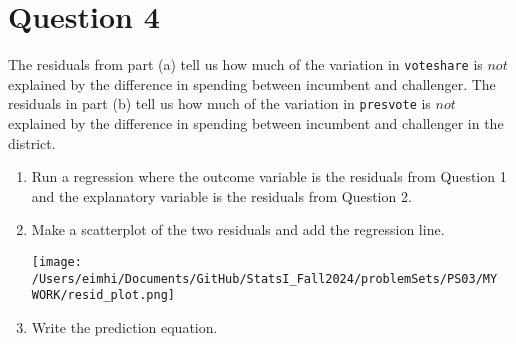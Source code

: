 \documentclass[12pt,letterpaper]{article}
\begin{document}
\section*{Question 4}
\noindent The residuals from part (a) tell us how much of the variation in \texttt{voteshare} is $not$ explained by the difference in spending between incumbent and challenger. The residuals in part (b) tell us how much of the variation in \texttt{presvote} is $not$ explained by the difference in spending between incumbent and challenger in the district.
	\begin{enumerate}
		\item Run a regression where the outcome variable is the residuals from Question 1 and the explanatory variable is the residuals from Question 2.	
		\vspace{1cm}
		
		  
		
		\vspace{1cm}
		
		\item Make a scatterplot of the two residuals and add the regression line.
		\vspace{1cm}
		
		  
		\vspace{1cm}
		
		\texttt{[image: /Users/eimhi/Documents/GitHub/StatsI\_Fall2024/problemSets/PS03/MY WORK/resid\_plot.png]}
		
		\vspace{1cm}
		
		
		\item Write the prediction equation.
		\vspace{1cm}
		
		  
		
		\vspace{1cm}
	\end{enumerate}
	
	\newpage	
\end{document}
